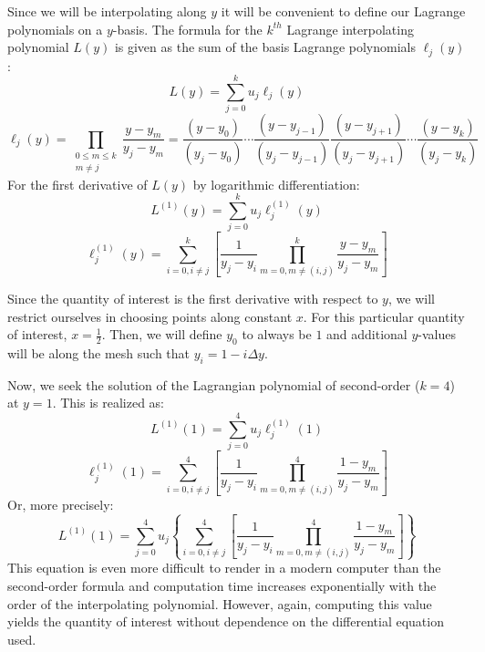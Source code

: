 \documentclass[10pt]{article}		%
\numberwithin{equation}{section}
\begin{document}
Since we will be interpolating along $y$ it will be convenient to define our Lagrange polynomials on a $y$-basis. The formula for the $k^{th}$ Lagrange interpolating polynomial $L(y)$ is given as the sum of the basis Lagrange polynomials $\ell_j(y)$:
\begin{equation}
L(y) = \sum_{j=0}^{k} u_j \ell_j(y)
\end{equation}
\begin{equation}
\ell_j(y) = \prod_{\begin{smallmatrix}0\le m\le k\\ m\neq j\end{smallmatrix}} \frac{y-y_m}{y_j-y_m} = \frac{(y-y_0)}{(y_j-y_0)} \cdots \frac{(y-y_{j-1})}{(y_j-y_{j-1})} \frac{(y-y_{j+1})}{(y_j-y_{j+1})} \cdots \frac{(y-y_k)}{(y_j-y_k)}
\end{equation}
For the first derivative of $L(y)$ by logarithmic differentiation:
\begin{equation}
L^{(1)}(y) = \sum_{j=0}^{k} u_j \ell_j^{(1)}(y)
\end{equation}
\begin{equation}
\ell_j^{(1)}(y) = \sum_{i=0, i\not=j}^k \left[ \frac{1}{y_j-y_i}\prod_{m=0,m\not = (i , j)}^k \frac{y-y_m}{y_j-y_m} \right]
\end{equation}

Since the quantity of interest is the first derivative with respect to $y$, we will restrict ourselves in choosing points along constant $x$. For this particular quantity of interest, $x=\tfrac{1}{2}$. Then, we will define $y_0$ to always be $1$ and additional $y$-values will be along the mesh such that $y_i = 1-i\Delta y$.

Now, we seek the solution of the Lagrangian polynomial of second-order ($k=4$) at $y=1$. This is realized as:
\begin{equation}
L^{(1)}(1) = \sum_{j=0}^{4} u_j \ell_j^{(1)}(1)
\end{equation}
\begin{equation}
\ell_j^{(1)}(1) = \sum_{i=0, i\not=j}^4 \left[ \frac{1}{y_j-y_i}\prod_{m=0,m\not = (i , j)}^4 \frac{1-y_m}{y_j-y_m} \right]
\end{equation}
Or, more precisely:
\begin{equation}
L^{(1)}(1) = \sum_{j=0}^{4} u_j \left\{ \sum_{i=0, i\not=j}^4 \left[ \frac{1}{y_j-y_i}\prod_{m=0,m\not = (i , j)}^4 \frac{1-y_m}{y_j-y_m} \right] \right\}
\end{equation}
This equation is even more difficult to render in a modern computer than the second-order formula and computation time increases exponentially with the order of the interpolating polynomial. However, again, computing this value yields the quantity of interest without dependence on the differential equation used. 
\end{document}
